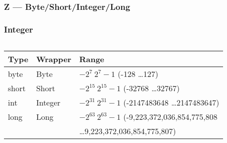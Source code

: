 \documentclass[
  11pt, %
  xcolor=dvipsnames
]{beamer}
\begin{document}
\subsubsection{Z --- Byte/Short/Integer/Long}
\begin{frame}[fragile]
	\frametitle{Integer}


	\begin{columns}[c]
		\begin{column}{0.9\textwidth}

			\begin{table}
				\begin{tabular}{l l l}
					\toprule
					Type  & Wrapper & Range                                                   \\
					\midrule
					byte  & Byte    & $ -2^{7} ~ 2^{7} - 1 $ (-128 \dots 127)                 \\
					short & Short   & $ -2^{15} ~ 2^{15} - 1 $ (-32768 \dots 32767)           \\
					int   & Integer & $ -2^{31} ~ 2^{31} - 1 $ (-2147483648 \dots 2147483647) \\
					long  & Long    & $ -2^{63} ~ 2^{63} - 1 $ (-9,223,372,036,854,775,808    \\
					      &         & \dots 9,223,372,036,854,775,807)                        \\
					\bottomrule
				\end{tabular}
			\end{table}


\end{column}
\end{columns}
\end{frame}
\end{document}
